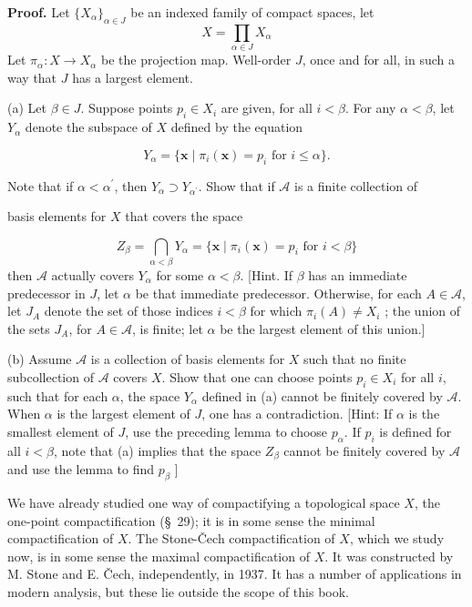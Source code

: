 \begin{enumerate}[itemsep=0.4em, parsep=0pt, topsep=0pt, partopsep=0pt, leftmargin=*, label=\arabic*., ref=\arabic*]
\textbf{Proof.}
 Let \({\{ X_{\alpha }\} }_{\alpha \in J}\) be an indexed family of compact spaces, let
\[
X = \mathop{\prod }\limits_{{\alpha \in J}}X_{\alpha }
\]
Let \({\pi }_{\alpha } : X \rightarrow {X}_{\alpha }\) be the projection map. Well-order \(J\), once and for all, in such a way that \(J\) has a largest element.

(a) Let \(\beta \in J\). Suppose points \(p_{i} \in {X}_{i}\) are given, for all \(i < \beta\). For any \(\alpha < \beta\), let \(Y_{\alpha }\) denote the subspace of \(X\) defined by the equation

\[
Y_{\alpha } = \{ {\mathbf{x} \mid {\pi }_{i}( \mathbf{x}) = p_{i}\text{ for }i \leq \alpha }\}.
\]

Note that if \(\alpha < {\alpha }^{\prime }\), then \(Y_{\alpha } \supset {Y}_{{\alpha }^{\prime }}\). Show that if \(\mathcal{A}\) is a finite collection of

basis elements for \(X\) that covers the space

\[
Z_{\beta } = \mathop{\bigcap }\limits_{{\alpha < \beta }}Y_{\alpha } = \{ {\mathbf{x} \mid {\pi }_{i}( \mathbf{x}) = p_{i}\text{ for }i < \beta }\}
\]
then \(\mathcal{A}\) actually covers \(Y_{\alpha }\) for some \(\alpha < \beta\). [Hint. If \(\beta\) has an immediate predecessor in \(J\), let \(\alpha\) be that immediate predecessor. Otherwise, for each \(A \in \mathcal{A}\), let \(J_{A}\) denote the set of those indices \(i < \beta\) for which \({\pi }_{i}(A) \neq {X}_{i}\) ; the union of the sets \(J_{A}\), for \(A \in \mathcal{A}\), is finite; let \(\alpha\) be the largest element of this union.]

(b) Assume \(\mathcal{A}\) is a collection of basis elements for \(X\) such that no finite subcollection of \(\mathcal{A}\) covers \(X\). Show that one can choose points \(p_{i} \in {X}_{i}\) for all \(i\), such that for each \(\alpha\), the space \(Y_{\alpha }\) defined in (a) cannot be finitely covered by \(\mathcal{A}\). When \(\alpha\) is the largest element of \(J\), one has a contradiction. [Hint: If \(\alpha\) is the smallest element of \(J\), use the preceding lemma to choose \(p_{\alpha }\). If \(p_{i}\) is defined for all \(i < \beta\), note that (a) implies that the space \(Z_{\beta }\) cannot be finitely covered by \(\mathcal{A}\) and use the lemma to find \(p_{\beta }\) ]
\end{enumerate}

We have already studied one way of compactifying a topological space \(X\), the one-point compactification (\S\ 29); it is in some sense the minimal compactification of \(X\). The Stone-Čech compactification of \(X\), which we study now, is in some sense the maximal compactification of \(X\). It was constructed by M. Stone and E. Čech, independently, in 1937. It has a number of applications in modern analysis, but these lie outside the scope of this book.

